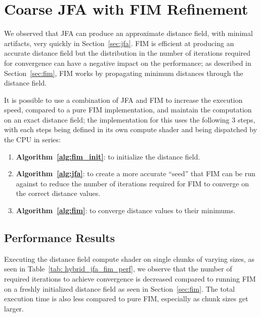 \section{Coarse JFA with FIM Refinement}
We observed that JFA can produce an approximate distance field, with minimal artifacts, very quickly in
Section~\ref{sec:jfa}. FIM is efficient at producing an accurate distance field but the distribution in the number of
iterations required for convergence can have a negative impact on the performance; as described in
Section~\ref{sec:fim}, FIM works by propagating minimum distances through the distance field.

It is possible to use a combination of JFA and FIM to increase the execution speed, compared to a pure FIM
implementation, and maintain the computation on an exact distance field; the implementation for this uses the following
3 steps, with each steps being defined in its own compute shader and being dispatched by the CPU in series:

\begin{enumerate}
    \item \textbf{Algorithm~\ref{alg:fim_init}}: to initialize the distance field.
    \item \textbf{Algorithm~\ref{alg:jfa}}: to create a more accurate ``seed'' that FIM can be run against to reduce the
          number of iterations required for FIM to converge on the correct distance values.
    \item \textbf{Algorithm~\ref{alg:fim}}: to converge distance values to their minimums.
\end{enumerate}

\subsection{Performance Results}
Executing the distance field compute shader on single chunks of varying sizes, as seen in
Table~\ref{tab: hybrid_jfa_fim_perf}, we observe that the number of required iterations to achieve convergence is
decreased compared to running FIM on a freshly initialized distance field as seen in Section~\ref{sec:fim}. The total
execution time is also less compared to pure FIM, especially as chunk sizes get larger.

